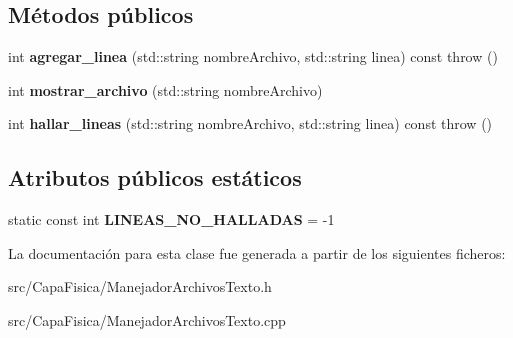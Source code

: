\subsection*{\-Métodos públicos}
\begin{DoxyCompactItemize}
\item 
\hypertarget{class_manejador_archivos_texto_aa7758f5ee944c6c19fa89f0cf0bc6133}{int {\bfseries agregar\-\_\-linea} (std\-::string nombre\-Archivo, std\-::string linea) const   throw ()}\label{class_manejador_archivos_texto_aa7758f5ee944c6c19fa89f0cf0bc6133}

\item 
\hypertarget{class_manejador_archivos_texto_afd7eae31e58acd5ea6218cea4fb56dc7}{int {\bfseries mostrar\-\_\-archivo} (std\-::string nombre\-Archivo)}\label{class_manejador_archivos_texto_afd7eae31e58acd5ea6218cea4fb56dc7}

\item 
\hypertarget{class_manejador_archivos_texto_a058dc15af4ed7291b698e612cec73b60}{int {\bfseries hallar\-\_\-lineas} (std\-::string nombre\-Archivo, std\-::string linea) const   throw ()}\label{class_manejador_archivos_texto_a058dc15af4ed7291b698e612cec73b60}

\end{DoxyCompactItemize}
\subsection*{\-Atributos públicos estáticos}
\begin{DoxyCompactItemize}
\item 
\hypertarget{class_manejador_archivos_texto_a4f5fcef7a05cfe2299aff6d8fe486b64}{static const int {\bfseries \-L\-I\-N\-E\-A\-S\-\_\-\-N\-O\-\_\-\-H\-A\-L\-L\-A\-D\-A\-S} = -\/1}\label{class_manejador_archivos_texto_a4f5fcef7a05cfe2299aff6d8fe486b64}

\end{DoxyCompactItemize}


\-La documentación para esta clase fue generada a partir de los siguientes ficheros\-:\begin{DoxyCompactItemize}
\item 
src/\-Capa\-Fisica/\-Manejador\-Archivos\-Texto.\-h\item 
src/\-Capa\-Fisica/\-Manejador\-Archivos\-Texto.\-cpp\end{DoxyCompactItemize}
